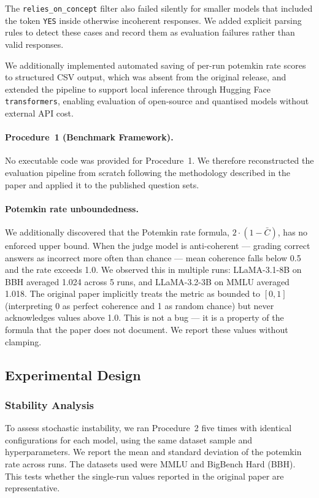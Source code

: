 \documentclass[sigconf,authordraft]{acmart}
\begin{document}
The \texttt{relies\_on\_concept} filter also failed silently for smaller models that included the token \texttt{YES} inside otherwise incoherent responses. We added explicit parsing rules to detect these cases and record them as evaluation failures rather than valid responses.

We additionally implemented automated saving of per-run potemkin rate scores to structured CSV output, which was absent from the original release, and extended the pipeline to support local inference through Hugging Face \texttt{transformers}, enabling evaluation of open-source and quantised models without external API cost.

\paragraph{Procedure~1 (Benchmark Framework).}
No executable code was provided for Procedure~1. We therefore reconstructed the evaluation pipeline from scratch following the methodology described in the paper and applied it to the published question sets.

\paragraph{Potemkin rate unboundedness.}
We additionally discovered that the Potemkin rate formula, $2 \cdot (1 - \bar{C})$, has no enforced upper bound. When the judge model is anti-coherent --- grading correct answers as incorrect more often than chance --- mean coherence falls below 0.5 and the rate exceeds 1.0. We observed this in multiple runs: LLaMA-3.1-8B on BBH averaged 1.024 across 5 runs, and LLaMA-3.2-3B on MMLU averaged 1.018. The original paper implicitly treats the metric as bounded to $[0, 1]$ (interpreting 0 as perfect coherence and 1 as random chance) but never acknowledges values above 1.0. This is not a bug --- it is a property of the formula that the paper does not document. We report these values without clamping.

\subsection{Experimental Design}

\subsubsection{Stability Analysis}

To assess stochastic instability, we ran Procedure~2 five times with identical configurations for each model, using the same dataset sample and hyperparameters. We report the mean and standard deviation of the potemkin rate across runs. The datasets used were MMLU and BigBench Hard (BBH). This tests whether the single-run values reported in the original paper are representative.
\end{document}
